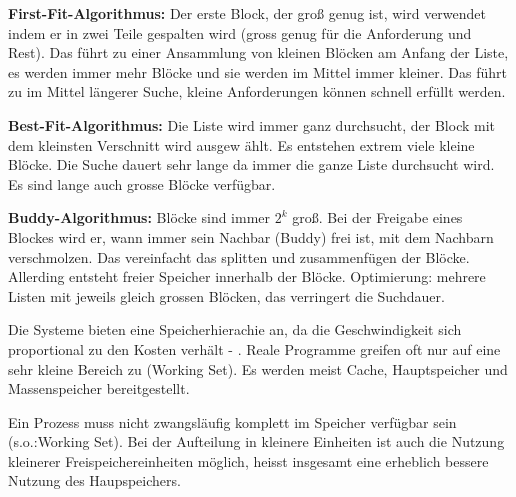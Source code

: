 \begin{answer}
  \textbf{First-Fit-Algorithmus:}
  Der erste Block, der groß genug ist, wird verwendet indem er in zwei Teile gespalten wird
  (gross genug für die Anforderung und Rest).
  Das führt zu einer Ansammlung von kleinen Blöcken am Anfang der Liste, es werden immer
  mehr Blöcke und sie werden im Mittel immer kleiner. Das führt zu im Mittel längerer
  Suche, kleine Anforderungen können schnell erfüllt werden.

  \textbf{Best-Fit-Algorithmus:}
  Die Liste wird immer ganz durchsucht, der Block mit dem kleinsten Verschnitt wird ausgew
  ählt.
  Es entstehen extrem viele kleine Blöcke. Die Suche dauert sehr lange da immer die ganze
  Liste durchsucht wird. Es sind lange auch grosse Blöcke verfügbar.

  \textbf{Buddy-Algorithmus:}
  Blöcke sind immer $2^k$ groß. Bei der Freigabe eines Blockes wird er, wann immer sein
  Nachbar (Buddy) frei ist, mit dem Nachbarn verschmolzen.
  Das vereinfacht das splitten und zusammenfügen der Blöcke. Allerding entsteht freier Speicher
  innerhalb der Blöcke.
  Optimierung: mehrere Listen mit jeweils gleich grossen Blöcken, das verringert die Suchdauer.
\end{answer}

\begin{answer}
  Die Systeme bieten eine Speicherhierachie an, da die Geschwindigkeit sich proportional zu den
  Kosten verhält - . Reale Programme greifen oft nur auf eine sehr kleine Bereich zu (Working Set). Es werden meist Cache, Hauptspeicher und Massenspeicher bereitgestellt.
\end{answer}

\begin{answer}
  Ein Prozess muss nicht zwangsläufig komplett im Speicher verfügbar sein (s.o.:Working
  Set). Bei der Aufteilung in kleinere Einheiten ist auch die Nutzung kleinerer Freispeichereinheiten möglich, heisst insgesamt eine erheblich bessere Nutzung des Haupspeichers.
\end{answer}

